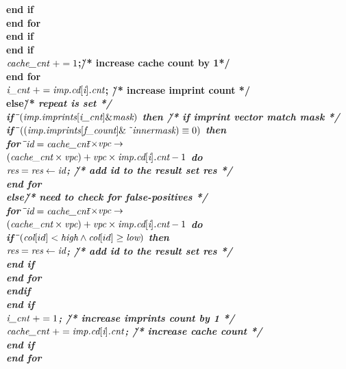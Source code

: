 \begin{algorithm}[t]
{\begin{tabbing}
\>\>\>\>\>\>\bf{end if}\\
\>\>\>\>\>\bf{end for}\\
\>\>\>\>\bf{end if}\\
\>\>\>\bf{end if}\\
\>\>\>$\it{cache\_cnt}\ += 1$;\` /* increase cache count by 1*/\\
\>\>\bf{end for}\\
\>\>$\it{i\_cnt}\ +=\it{imp.cd}[\it{i}]\it{.cnt}$; \` /* increase imprint count */\\
\>\bf{else}\`  /* \it{repeat} is set */\\
\>\>\bf{if}\=\ $(\it{imp.imprints}[\it{i\_cnt}]\& \it{mask})$ \bf{then}
\` /* if imprint vector match mask */\\
\>\>\>\bf{if}\=\ $((\it{imp.imprints}[\it{f\_count}]\&\ \tilde{\ }\it{innermask})
\equiv 0)$ \bf{then}\\
\>\>\>\>\bf{for}\=\ $\it{id}=\it{cache\_cnt}$\=$\times\it{vpc}\rightarrow$\\
\>\>\>\>\>\>$(\it{cache\_cnt}\times\it{vpc})+\it{vpc}\times\it{imp.cd}[\it{i}]\it{.cnt}-1$ \bf{do}\\
\>\>\>\>\>$\it{res}=\it{res}\leftarrow\it{id}$;
\` /* add \it{id} to the result set \it{res} */\\
\>\>\>\>\bf{end for}\\
\>\>\>\bf{else}\` /* need to check for false-positives */\\
\>\>\>\>\bf{for}\=\ $\it{id}=\it{cache\_cnt}$\=$\times\it{vpc}\rightarrow$\\
\>\>\>\>\>\>$(\it{cache\_cnt}\times\it{vpc})+\it{vpc}\times\it{imp.cd}[\it{i}]\it{.cnt}-1$ \bf{do}\\
\>\>\>\>\>\bf{if}\=\ $(\it{col}[id]<\it{high}\wedge\it{col}[id]
\geq\it{low})$ \bf{then}\\
\>\>\>\>\>\>$\it{res}=\it{res}\leftarrow\it{id}$;
\` /* add \it{id} to the result set \it{res} */\\
\>\>\>\>\>\bf{end if}\\
\>\>\>\>\bf{end for}\\
\>\>\>\bf{endif}\\
\>\>\bf{end if}\\
\>\>$\it{i\_cnt}\ += 1$; \` /* increase imprints count by 1 */\\
\>\>$\it{cache\_cnt}\ += \it{imp.cd}[\it{i}]\it{.cnt}$;
\` /* increase cache count */\\
\>\bf{end if}\\
\bf{end for}
\end{tabbing}
}%
\vspace{-10pt}
\end{algorithm}


